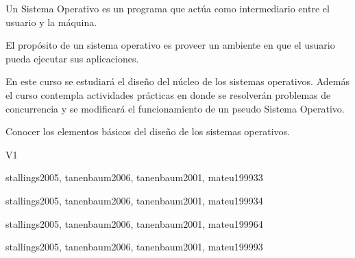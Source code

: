 \begin{syllabus}


\begin{justification}
Un Sistema Operativo es un programa que actúa como intermediario entre el usuario y la máquina.

El propósito de un sistema operativo es proveer un ambiente en que el usuario pueda ejecutar sus aplicaciones.

En este curso se estudiará el diseño del núcleo de los sistemas operativos.
Además el curso contempla actividades prácticas en donde se resolverán problemas de 
concurrencia y se modificará el funcionamiento de un pseudo Sistema Operativo.
\end{justification}

\begin{goals}
\item Conocer los elementos básicos del diseño de los sistemas operativos.
\end{goals}

\begin{outcomes}{V1}
\end{outcomes}

\begin{unit}{\ALDistributedAlgorithmsDef}{}{stallings2005, tanenbaum2006, tanenbaum2001, mateu1999}{3}{3}
   \ALDistributedAlgorithmsAllTopics
   \ALDistributedAlgorithmsAllObjectives
\end{unit}

\begin{unit}{\OSOverviewofOperatingSystemsDef}{}{stallings2005, tanenbaum2006, tanenbaum2001, mateu1999}{3}{4}
    \OSOverviewofOperatingSystemsAllTopics
    \OSOverviewofOperatingSystemsAllObjectives
\end{unit}

\begin{unit}{\OSOperatingSystemsPrinciplesDef}{}{stallings2005, tanenbaum2006, tanenbaum2001, mateu1999}{6}{4}
    \OSOperatingSystemsPrinciplesAllTopics
    \OSOperatingSystemsPrinciplesAllObjectives
\end{unit}

\begin{unit}{\OSConcurrencyDef}{}{stallings2005, tanenbaum2006, tanenbaum2001, mateu1999}{9}{3}
    \OSConcurrencyAllTopics
    \OSConcurrencyAllObjectives
\end{unit}


\end{syllabus}
